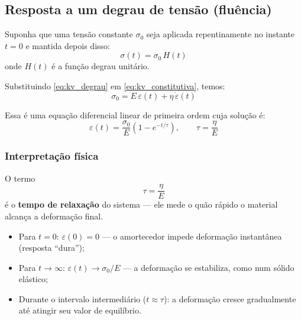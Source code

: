 \subsection*{Resposta a um degrau de tensão (fluência)}
Suponha que uma tensão constante $\sigma_0$ seja aplicada repentinamente no instante $t=0$ e mantida depois disso:
\begin{equation}
\sigma(t) = \sigma_0\,H(t)
\label{eq:kv_degrau}
\end{equation}
onde $H(t)$ é a função degrau unitário.

Substituindo \eqref{eq:kv_degrau} em \eqref{eq:kv_constitutiva}, temos:
\begin{equation}
\sigma_0 = E\,\varepsilon(t) + \eta\,\dot{\varepsilon}(t)
\label{eq:kv_EDO}
\end{equation}

Essa é uma equação diferencial linear de primeira ordem cuja solução é:
\begin{equation}
\varepsilon(t) = \frac{\sigma_0}{E}\left(1 - e^{-t/\tau}\right),
\qquad 
\tau = \frac{\eta}{E}
\label{eq:kv_solucao}
\end{equation}

\subsubsection*{Interpretação física}
O termo 
\begin{equation}
\tau = \frac{\eta}{E}
\label{eq:kv_tau}
\end{equation}
é o \textbf{tempo de relaxação} do sistema — ele mede o quão rápido o material alcança a deformação final.

\begin{itemize}
    \item Para $t = 0$: $\varepsilon(0) = 0$ — o amortecedor impede deformação instantânea (resposta “dura”);
    \item Para $t \to \infty$: $\varepsilon(t) \to \sigma_0/E$ — a deformação se estabiliza, como num sólido elástico;
    \item Durante o intervalo intermediário ($t \approx \tau$): a deformação cresce gradualmente até atingir seu valor de equilíbrio.
\end{itemize}

